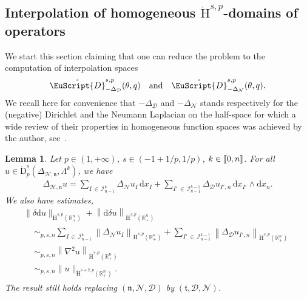 \documentclass[10pt]{amsart}
\newtheorem{lemm}[theo]{Lemma}\newtheorem{prop}[theo]{Proposition}\newtheorem{coro}[theo]{Corollary}\newtheorem{conj}[theo]{Conjecture}
\theoremstyle{definition}\newtheorem{defi}[theo]{Definition}\newtheorem{rema}[theo]{Remark}\newtheorem{exam}[theo]{Example}\newtheorem{exem}[theo]{Example}\newtheorem{nota}[theo]{Notation}
\newcommand{\bbR}{\mathbb{R}}
\newcommand{\rmH}{\mathrm{H}}%
\newcommand{\rmd}{\mathrm{d}}
\newcommand{\rmD}{\mathrm{D}}
\newcommand{\clH}{\mathcal{H}}
\newcommand{\clI}{\mathcal{I}}
\newcommand{\clN}{\mathcal{N}}
\newcommand{\clD}{\mathcal{D}}
\newcommand{\fkn}{\mathfrak{n}}
\newcommand{\fkt}{\mathfrak{t}}
\newcommand{\rgeusD}{\mathring{\eus{D}}}
\newcommand{\eus}{\EuScript}
\newcommand{\llbracket}{\mathopen{[\mkern -2.7mu[}}
\newcommand{\rrbracket}{\mathclose{]\mkern -2.7mu]}}
\newcommand{\llb}{\llbracket}
\newcommand{\rrb}{\rrbracket}
\begin{document}
\subsection{Interpolation of homogeneous \texorpdfstring{$\dot{\rmH}^{s,p}$}{Hsp}-domains of operators}\label{sec:homogeneousinterp}


We start this section claiming that one can reduce the problem to the computation of interpolation spaces
\begin{align*}
\rgeusD^{s,p}_{-{\Delta}_{\clD}}(\theta,q) \quad\text{and}\quad \rgeusD^{s,p}_{-{\Delta}_{\clN}}(\theta,q).
\end{align*}
We recall here for convenience that $-{\Delta}_{\clD}$ and $-{\Delta}_{\clN}$ stands respectively for the (negative) Dirichlet and the Neumann Laplacian on the half-space for which a wide review of their properties in homogeneous function spaces was achieved by the author, see~\cite[Section~5]{Gaudin2022}.


\begin{lemm}\label{lem:Hs+2pestimateHodgeLap}
Let $p\in(1,+\infty)$, $s\in(-1+1/p,1/p)$, $k\in \llb 0,n\rrb$. For all $u \in\dot{\rmD}^{s}_{p}({{\Delta}}_{\clH,\fkn},\Lambda^k)$, we have
\begin{align*}
{{\Delta}}_{\clH,\fkn} u = \sum_{I\,\in\,\clI^{k}_{n-1}} \Delta_{\clN} u_{I}\,\rmd{x_I} + \sum_{I'\,\in\,\clI^{k-1}_{n-1}} \Delta_{\clD} u_{I',n}\,\rmd{x_{I'}}\wedge\rmd x_n .
\end{align*}
We also have estimates,
\begin{multline*}
\| \delta \rmd u \|_{\dot{\rmH}^{s,p}\left(\bbR^n_+\right)} + \left\| \rmd\delta u \right\|_{\dot{\rmH}^{s,p}\left(\bbR^n_+\right)}\\
\begin{aligned}
&\sim_{p,s,n} \sum_{I\,\in\,\clI^{k}_{n-1}} \left\| \Delta_{\clN} u_{I} \right\|_{\dot{\rmH}^{s,p}\left(\bbR^n_+\right)} + \sum_{I'\,\in\,\clI^{k-1}_{n-1}} \left\| \Delta_{\clD} u_{I',n} \right\|_{\dot{\rmH}^{s,p}\left(\bbR^n_+\right)}\\
& \sim_{p,s,n} \left\| \nabla^2 u \right\|_{\dot{\rmH}^{s,p}\left(\bbR^n_+\right)}\\
& \sim_{p,s,n} \| u \|_{\dot{\rmH}^{s+2,p}\left(\bbR^n_+\right)}.
\end{aligned}
\end{multline*}
The result still holds replacing $(\fkn,\clN,\clD)$ by $(\fkt,\clD,\clN)$.
\end{lemm}
\end{document}
